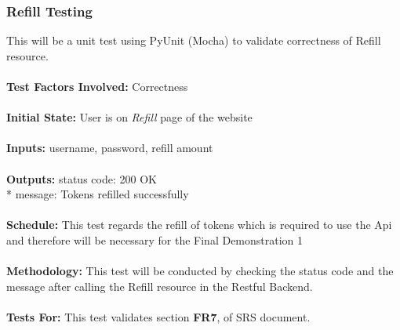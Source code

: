 \documentclass[12pt, titlepage]{article}
\begin{document}
\subsubsection{{Refill Testing}}
This will be a unit test using PyUnit (Mocha) to validate correctness of Refill resource. \\
\\
\textbf{Test Factors Involved:} Correctness \\
\\
\textbf{Initial State: } User is on \textit{Refill} page of the website \\
\\
\textbf{Inputs: } username, password, refill amount \\
\\
\textbf{Outputs:} status code: 200 OK \\*
                  message: Tokens refilled successfully \\
\\
\textbf{Schedule:} This test regards the refill of tokens which is required to use the Api and therefore will be necessary for the Final Demonstration 1 \\
\\
\textbf{Methodology: } This test will be conducted by checking the status code and the message after calling the Refill resource in the Restful Backend. \\
\\
\textbf{Tests For:} This test validates section \textbf{FR7}, of SRS document.

\end{document}
